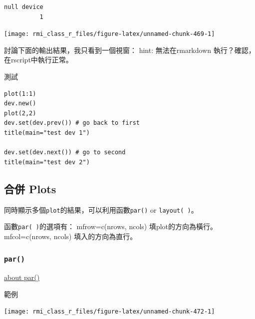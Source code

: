 \documentclass[]{book}
\newenvironment{Shaded}{\begin{snugshade}}{\end{snugshade}}
\newcommand{\KeywordTok}[1]{\textcolor[rgb]{0.13,0.29,0.53}{\textbf{#1}}}
\newcommand{\NormalTok}[1]{#1}
\newcommand{\OperatorTok}[1]{\textcolor[rgb]{0.81,0.36,0.00}{\textbf{#1}}}
\theoremstyle{definition}
\theoremstyle{definition}
\theoremstyle{definition}
\theoremstyle{remark}
\begin{document}
\begin{verbatim}
null device 
          1 
\end{verbatim}

\begin{center}\texttt{[image: rmi\_class\_r\_files/figure-latex/unnamed-chunk-469-1]} \end{center}

討論下面的輸出結果，我只看到一個視窗： hint: 無法在rmarkdown
執行？確認，在rscript中執行正常。

\begin{Shaded}
\end{Shaded}

測試

\begin{verbatim}
plot(1:1)
dev.new()
plot(2,2)
dev.set(dev.prev()) # go back to first
title(main="test dev 1")

dev.set(dev.next()) # go to second
title(main="test dev 2")
\end{verbatim}

\hypertarget{-plots}{%
\subsection{合併 Plots}\label{-plots}}

同時顯示多個\texttt{plot}的結果，可以利用函數\texttt{par()} or
\texttt{layout(\ )}。

函數\texttt{par(\ )}的選項有： mfrow=c(nrows, ncols)
填plot的方向為橫行。\\
mfcol=c(nrows, ncols) 填入的方向為直行。

\hypertarget{par}{%
\subsubsection{\texorpdfstring{\texttt{par()}}{par()}}\label{par}}

\href{https://thepracticalr.wordpress.com/tag/plotting/}{about par()}

範例

\begin{center}\texttt{[image: rmi\_class\_r\_files/figure-latex/unnamed-chunk-472-1]} \end{center}
\end{document}
